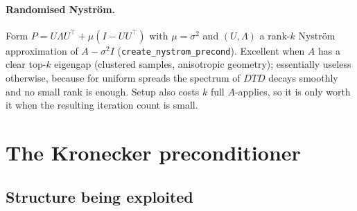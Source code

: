 \documentclass[11pt]{article}
\begin{document}
\paragraph{Randomised Nystr\"{o}m.}
Form $P = U \Lambda U^\top + \mu(I - UU^\top)$ with $\mu = \sigma^2$ and
$(U,\Lambda)$ a rank-$k$ Nystr\"{o}m approximation of $A - \sigma^2 I$
(\texttt{create\_nystrom\_precond}). Excellent when $A$ has a clear
top-$k$ eigengap (clustered samples, anisotropic geometry); essentially
useless otherwise, because for uniform spreads the spectrum of $DTD$
decays smoothly and no small rank is enough. Setup also costs $k$ full
$A$-applies, so it is only worth it when the resulting iteration count
is small.

\section{The Kronecker preconditioner}

\subsection{Structure being exploited}
\end{document}
